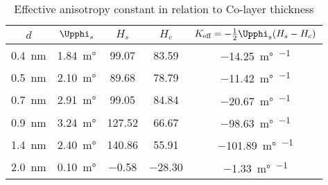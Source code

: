 \begingroup
\renewcommand{\arraystretch}{1.4}
\begin{table}
	\begin{center}
	\caption{Effective anisotropy constant in relation to Co-layer thickness}
	\begin{tabular*}{0.9\textwidth}{@{\extracolsep{\fill}} c|cccc}
  \toprule
	\hline
  $d$ & $\Upphi_s$ & $H_s$ & $H_c$ & $K_\text{eff} = -\frac{1}{2}\Upphi_s(H_s-H_c)$ \\
	\hline
	\SI{0.4}{\nano\meter} & \SI{1.84}{\milli\degree} & \SI{99.07}{\oersted} & \SI{83.59}{\oersted} & \SI{-14.25}{\milli\degree\per\oersted} \\
	\SI{0.5}{\nano\meter} & \SI{2.10}{\milli\degree} & \SI{89.68}{\oersted} & \SI{78.79}{\oersted} & \SI{-11.42}{\milli\degree\per\oersted} \\
	\SI{0.7}{\nano\meter} & \SI{2.91}{\milli\degree} & \SI{99.05}{\oersted} & \SI{84.84}{\oersted} & \SI{-20.67}{\milli\degree\per\oersted} \\
	\SI{0.9}{\nano\meter} & \SI{3.24}{\milli\degree} & \SI{127.52}{\oersted} & \SI{66.67}{\oersted} & \SI{-98.63}{\milli\degree\per\oersted} \\
	\SI{1.4}{\nano\meter} & \SI{2.40}{\milli\degree} & \SI{140.86}{\oersted} & \SI{55.91}{\oersted} & \SI{-101.89}{\milli\degree\per\oersted} \\
	\SI{2.0}{\nano\meter} & \SI{0.10}{\milli\degree} & \SI{-0.58}{\oersted} & \SI{-28.30}{\oersted} & \SI{-1.33}{\milli\degree\per\oersted} \\
  \bottomrule
	\end{tabular*}
	\label{tab:K-eff-ferromagnet}
	\end{center}
\end{table}
\endgroup
